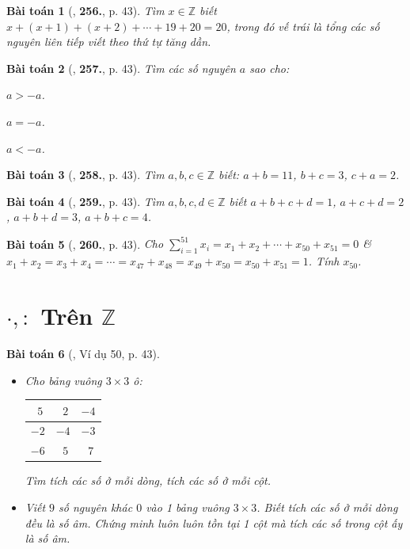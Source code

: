 \documentclass{article}
\numberwithin{equation}{section}
\newtheorem{baitoan}{Bài toán}
\begin{document}
\begin{baitoan}[\cite{Binh_Toan_6_tap_1}, \textbf{256.}, p. 43]
	Tìm $x\in\mathbb{Z}$ biết $x + (x + 1) + (x + 2) + \cdots + 19 + 20 = 20$, trong đó vế trái là tổng các số nguyên liên tiếp viết theo thứ tự tăng dần.
\end{baitoan}

\begin{baitoan}[\cite{Binh_Toan_6_tap_1}, \textbf{257.}, p. 43]
	Tìm các số nguyên $a$ sao cho:
	\begin{enumerate*}
		\item[(a)] $a > -a$.
		\item[(b)] $a = -a$.
		\item[(c)] $a < -a$.
	\end{enumerate*}
\end{baitoan}

\begin{baitoan}[\cite{Binh_Toan_6_tap_1}, \textbf{258.}, p. 43]
	Tìm $a,b,c\in\mathbb{Z}$ biết: $a + b = 11$, $b + c = 3$, $c + a = 2$.
\end{baitoan}

\begin{baitoan}[\cite{Binh_Toan_6_tap_1}, \textbf{259.}, p. 43]
	Tìm $a,b,c,d\in\mathbb{Z}$ biết $a + b + c + d = 1$, $a + c + d = 2$, $a + b + d = 3$, $a + b + c = 4$.
\end{baitoan}

\begin{baitoan}[\cite{Binh_Toan_6_tap_1}, \textbf{260.}, p. 43]
	Cho $\sum_{i=1}^{51} x_i = x_1 + x_2 + \cdots + x_{50} + x_{51} = 0$ \& $x_1 + x_2 = x_3 + x_4 = \cdots = x_{47} + x_{48} = x_{49} + x_{50} = x_{50} + x_{51} = 1$. Tính $x_{50}$.
\end{baitoan}


\section{$\cdot,:$ Trên $\mathbb{Z}$}

\begin{baitoan}[\cite{Binh_Toan_6_tap_1}, Ví dụ 50, p. 43]
	\begin{itemize}
		\item[(a)] Cho bảng vuông $3\times 3$ ô:
		\begin{table}[H]
			\centering
			\begin{tabular}{|c|c|c|}
				\hline
				$\ \ 5$ & $\ \ 2$ & $-4$ \\
				\hline
				$-2$ & $-4$ & $-3$ \\
				\hline
				$-6$ & $\ \ 5$ & $\ \ 7$ \\
				\hline
			\end{tabular}
		\end{table}
		Tìm tích các số ở mỗi dòng, tích các số ở mỗi cột.
		\item[(b)] Viết $9$ số nguyên khác $0$ vào 1 bảng vuông $3\times 3$. Biết tích các số ở mỗi dòng đều là số âm. Chứng minh luôn luôn tồn tại 1 cột mà tích các số trong cột ấy là số âm.
	\end{itemize}
\end{baitoan}
\end{document}
